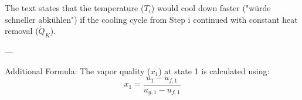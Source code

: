 The text states that the temperature (\(T_i\)) would cool down faster ("würde schneller abkühlen") if the cooling cycle from Step i continued with constant heat removal (\(\dot{Q}_K\)).

---

Additional Formula:  
The vapor quality (\(x_1\)) at state 1 is calculated using:  
\[
x_1 = \frac{u_1 - u_{f,1}}{u_{g,1} - u_{f,1}}
\]